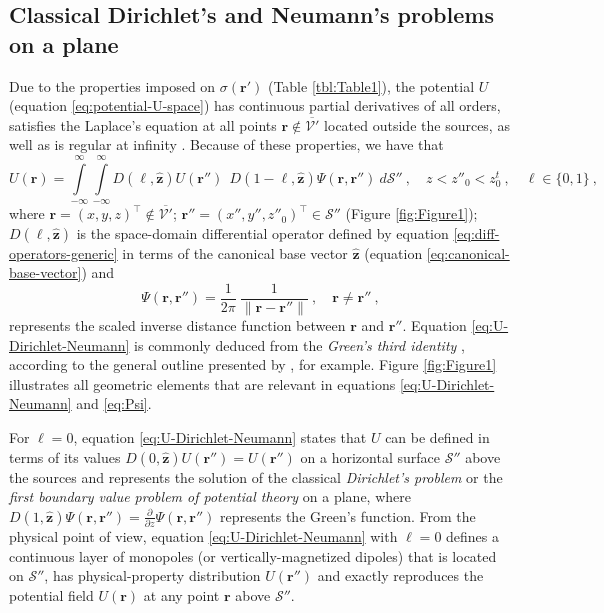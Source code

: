 \documentclass[manuscript,noblind]{geophysics}
\begin{document}
	
	\subsection{Classical Dirichlet's and Neumann's problems on a plane}
	\label{subsec:dirichlet_neumann}
	
	Due to the properties imposed on $\sigma(\mathbf{r}')$ (Table \ref{tbl:Table1}), the potential 
	$U$ (equation \ref{eq:potential-U-space}) has continuous partial derivatives of all orders, 
	satisfies the Laplace's equation at all points $\mathbf{r} \notin \overline{\mathcal{V}'}$ 
	located outside the sources, as well as is regular at infinity \citep[][ p. 122--124, 217]{kellogg1967}.
	Because of these properties, we have that
	\begin{equation}
		U(\mathbf{r}) = 
		\int\limits_{-\infty}^{\infty} \int\limits_{-\infty}^{\infty}
		D(\ell, \hat{\mathbf{z}}) U(\mathbf{r}'') \:\: 
		D(1 - \ell, \hat{\mathbf{z}}) \Psi(\mathbf{r}, \mathbf{r}'')
		\: d\mathcal{S}'' \: , \quad  z < z''_{0} < z^{t}_{0} \: ,
		\quad \ell \in \{0, 1\} \: ,
		\label{eq:U-Dirichlet-Neumann}
	\end{equation}
	where $\mathbf{r} = (x, y, z)^{\top} \notin \overline{\mathcal{V}'}$; 
	$\mathbf{r}'' = (x'', y'', z''_{0})^{\top} \in \mathcal{S}''$ (Figure \ref{fig:Figure1}); 
	$D(\ell, \hat{\mathbf{z}})$ is the space-domain differential operator 
	defined by equation \ref{eq:diff-operators-generic} in terms of the canonical base vector 
	$\hat{\mathbf{z}}$ (equation \ref{eq:canonical-base-vector}) and 
	\begin{equation}
		\Psi(\mathbf{r}, \mathbf{r}'') = 
		\frac{1}{2\pi} \: 
		\frac{1}{\| \mathbf{r} - \mathbf{r}'' \|} \: , 
		\quad \mathbf{r} \ne \mathbf{r}'' \: ,
		\label{eq:Psi}
	\end{equation}
	represents the scaled inverse distance function between $\mathbf{r}$ and $\mathbf{r}''$. 
	Equation \ref{eq:U-Dirichlet-Neumann} is commonly deduced from 
	the \textit{Green's third identity} \citep[][ p. 219]{kellogg1967}, according to
	the general outline presented by \cite{roy1962}, for example.
	Figure \ref{fig:Figure1} illustrates all geometric elements that are relevant in equations  
	\ref{eq:U-Dirichlet-Neumann} and \ref{eq:Psi}.
	
	For $\ell = 0$, equation \ref{eq:U-Dirichlet-Neumann} states that $U$ can be defined
	in terms of its values $D(0, \hat{\mathbf{z}}) U(\mathbf{r}'') = U(\mathbf{r}'')$ on a horizontal surface $\mathcal{S}''$ 
	above the sources and represents the solution of the classical \textit{Dirichlet’s problem} or the 
	\textit{first boundary value problem of potential theory} \cite[][ p. 236]{kellogg1967} on a plane, where 
	$D(1, \hat{\mathbf{z}}) \Psi(\mathbf{r}, \mathbf{r}'') = \tfrac{\partial}{\partial z} \Psi(\mathbf{r}, \mathbf{r}'')$ 
	represents the Green's function.
	From the physical point of view, equation \ref{eq:U-Dirichlet-Neumann} with $\ell = 0$ defines a continuous 
	layer of monopoles (or vertically-magnetized dipoles) that is located on $\mathcal{S}''$, has 
	physical-property distribution $U(\mathbf{r}'')$ and exactly reproduces the 
	potential field $U(\mathbf{r})$ at any point $\mathbf{r}$ above $\mathcal{S}''$.
	
\end{document}
